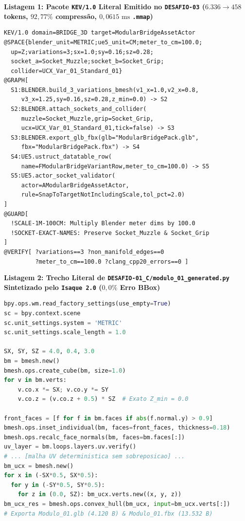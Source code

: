 \documentclass[10pt,a4paper]{article}
\begin{document}
\begin{minipage}[t]{0.485\linewidth}
{\raggedright\textbf{\footnotesize Listagem 1: Pacote \texttt{KEV/1.0} Literal Emitido no \texttt{DESAFIO-03} ($6.336 \to 458$ tokens, $92,77\%$ compress\~ao, $0,0615\text{ ms}$ \texttt{.mmap})}\par}
\begin{lstlisting}
KEV/1.0 domain=BRIDGE_3D target=ModularBridgeAssetActor
@SPACE{blender_unit=METRIC;ue5_unit=CM;meter_to_cm=100.0;
  up=Z;variations=3;sx=1.0;sy=0.16;sz=0.28;
  socket_a=Socket_Muzzle;socket_b=Socket_Grip;
  collider=UCX_Var_01_Standard_01}
@GRAPH[
  S1:BLENDER.build_3_variations_bmesh(v1_x=1.0,v2_x=0.8,
     v3_x=1.25,sy=0.16,sz=0.28,z_min=0.0) -> S2
  S2:BLENDER.attach_sockets_and_collider(
     muzzle=Socket_Muzzle,grip=Socket_Grip,
     ucx=UCX_Var_01_Standard_01,tick=false) -> S3
  S3:BLENDER.export_glb_fbx(glb="ModularBridgePack.glb",
     fbx="ModularBridgePack.fbx") -> S4
  S4:UE5.ustruct_datatable_row(
     name=FModularBridgeVariantRow,meter_to_cm=100.0) -> S5
  S5:UE5.actor_socket_validator(
     actor=AModularBridgeAssetActor,
     rule=SnapToTargetNotIncludingScale,tol_pct=2.0)
]
@GUARD[
  !SCALE-1M-100CM: Multiply Blender meter dims by 100.0
  !SOCKET-EXACT-NAMES: Preserve Socket_Muzzle & Socket_Grip
]
@VERIFY[ ?variations==3 ?non_manifold_edges==0
         ?meter_to_cm==100.0 ?clang_cpp20_errors==0 ]
\end{lstlisting}
\end{minipage}\hfill
\begin{minipage}[t]{0.485\linewidth}
{\raggedright\textbf{\footnotesize Listagem 2: Trecho Literal de \texttt{DESAFIO-01\_\allowbreak{}C/modulo\_\allowbreak{}01\_\allowbreak{}generated.py} Sintetizado pelo \texttt{Isaque 2.0} ($0,0\%$ Erro BBox)}\par}
\begin{lstlisting}[language=Python]
bpy.ops.wm.read_factory_settings(use_empty=True)
sc = bpy.context.scene
sc.unit_settings.system = 'METRIC'
sc.unit_settings.scale_length = 1.0

SX, SY, SZ = 4.0, 0.4, 3.0
bm = bmesh.new()
bmesh.ops.create_cube(bm, size=1.0)
for v in bm.verts:
    v.co.x *= SX; v.co.y *= SY
    v.co.z = (v.co.z + 0.5) * SZ  # Exato Z_min = 0.0

front_faces = [f for f in bm.faces if abs(f.normal.y) > 0.9]
bmesh.ops.inset_individual(bm, faces=front_faces, thickness=0.18)
bmesh.ops.recalc_face_normals(bm, faces=bm.faces[:])
uv_layer = bm.loops.layers.uv.verify()
# ... [malha UV deterministica sem sobreposicao] ...
bm_ucx = bmesh.new()
for x in (-SX*0.5, SX*0.5):
  for y in (-SY*0.5, SY*0.5):
    for z in (0.0, SZ): bm_ucx.verts.new((x, y, z))
bm_ucx_res = bmesh.ops.convex_hull(bm_ucx, input=bm_ucx.verts[:])
# Exporta Modulo_01.glb (4.120 B) & Modulo_01.fbx (13.532 B)
\end{lstlisting}
\end{minipage}
\end{document}
